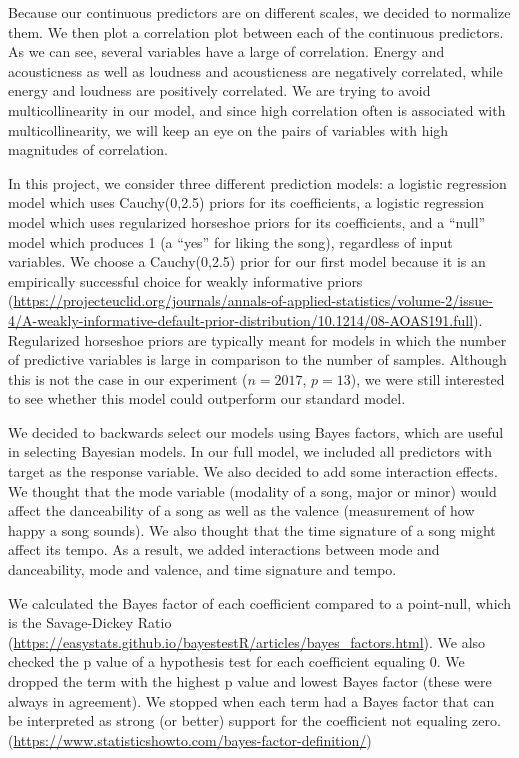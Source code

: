 \documentclass[
]{article}
\begin{document}
Because our continuous predictors are on different scales, we decided to
normalize them. We then plot a correlation plot between each of the
continuous predictors. As we can see, several variables have a large of
correlation. Energy and acousticness as well as loudness and
acousticness are negatively correlated, while energy and loudness are
positively correlated. We are trying to avoid multicollinearity in our
model, and since high correlation often is associated with
multicollinearity, we will keep an eye on the pairs of variables with
high magnitudes of correlation.

In this project, we consider three different prediction models: a
logistic regression model which uses Cauchy(0,2.5) priors for its
coefficients, a logistic regression model which uses regularized
horseshoe priors for its coefficients, and a ``null'' model which
produces 1 (a ``yes'' for liking the song), regardless of input
variables. We choose a Cauchy(0,2.5) prior for our first model because
it is an empirically successful choice for weakly informative priors
(\url{https://projecteuclid.org/journals/annals-of-applied-statistics/volume-2/issue-4/A-weakly-informative-default-prior-distribution/10.1214/08-AOAS191.full}).
Regularized horseshoe priors are typically meant for models in which the
number of predictive variables is large in comparison to the number of
samples. Although this is not the case in our experiment (\(n=2017\),
\(p=13\)), we were still interested to see whether this model could
outperform our standard model.

We decided to backwards select our models using Bayes factors, which are
useful in selecting Bayesian models. In our full model, we included all
predictors with target as the response variable. We also decided to add
some interaction effects. We thought that the mode variable (modality of
a song, major or minor) would affect the danceability of a song as well
as the valence (measurement of how happy a song sounds). We also thought
that the time signature of a song might affect its tempo. As a result,
we added interactions between mode and danceability, mode and valence,
and time signature and tempo.

We calculated the Bayes factor of each coefficient compared to a
point-null, which is the Savage-Dickey Ratio
(\url{https://easystats.github.io/bayestestR/articles/bayes_factors.html}).
We also checked the p value of a hypothesis test for each coefficient
equaling 0. We dropped the term with the highest p value and lowest
Bayes factor (these were always in agreement). We stopped when each term
had a Bayes factor that can be interpreted as strong (or better) support
for the coefficient not equaling zero.
(\url{https://www.statisticshowto.com/bayes-factor-definition/})
\end{document}
